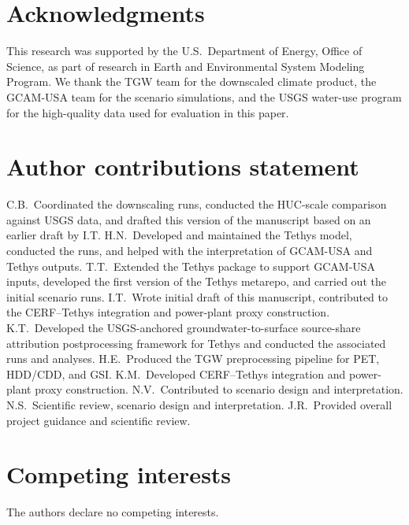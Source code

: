 \documentclass[fleqn,10pt]{wlscirep}
\begin{document}
\section*{Acknowledgments}

This research was supported by the U.S.~Department of Energy, Office of Science, as part of research in Earth and Environmental System Modeling Program. We thank the TGW team for the downscaled climate product, the GCAM-USA team for the scenario simulations, and the USGS water-use program for the high-quality data used for evaluation in this paper.

\section*{Author contributions statement}

C.B.~Coordinated the downscaling runs, conducted the HUC-scale comparison against USGS data, and drafted this version of the manuscript based on an earlier draft by I.T. 
H.N.~Developed and maintained the Tethys model, conducted the runs, and helped with the interpretation of GCAM-USA and Tethys outputs. 
T.T.~Extended the Tethys package to support GCAM-USA inputs, developed the first version of the Tethys metarepo, and carried out the initial scenario runs. 
I.T.~Wrote initial draft of this manuscript, contributed to the CERF--Tethys integration and power-plant proxy construction. 
K.T.~Developed the USGS-anchored groundwater-to-surface source-share attribution postprocessing framework for Tethys and conducted the associated runs and analyses. 
H.E.~Produced the TGW preprocessing pipeline for PET, HDD/CDD, and GSI. 
K.M.~Developed CERF--Tethys integration and power-plant proxy construction. 
N.V.~Contributed to scenario design and interpretation. 
N.S.~Scientific review, scenario design and interpretation. 
J.R.~Provided overall project guidance and scientific review. 

\section*{Competing interests}

The authors declare no competing interests.


\end{document}
